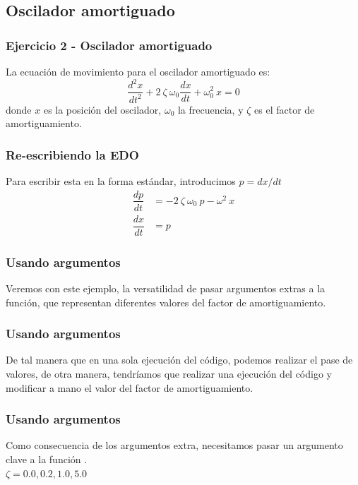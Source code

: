 \subsection{Oscilador amortiguado}
\begin{frame}
\frametitle{Ejercicio 2 - Oscilador amortiguado}
La ecuación de movimiento para el oscilador amortiguado es:
\[ \dfrac{d^{2} x}{dt^{2}} + 2 \: \zeta \:  \omega_{0} \dfrac{dx}{dt} + \omega_{0}^{2} \: x = 0\]
donde $x$ es la posición del oscilador, $\omega_{0}$ la frecuencia, y $\zeta$ es el factor de amortiguamiento.
\end{frame}
\begin{frame}
\frametitle{Re-escribiendo la EDO}
Para escribir esta  en la forma estándar, introducimos $p = dx/dt$
\begin{align*}
\dfrac{dp}{dt} &= - 2 \: \zeta \: \omega_{0} \: p - \omega^{2} \: x \\
\dfrac{dx}{dt} &= p
\end{align*}
\end{frame}
\begin{frame}
\frametitle{Usando argumentos}
Veremos con este ejemplo, la versatilidad de pasar argumentos extras a la función, que representan diferentes valores del factor de amortiguamiento.
\end{frame}
\begin{frame}
\frametitle{Usando argumentos}
De tal manera que en una sola ejecución del código, podemos realizar el pase de valores, de otra manera, tendríamos que realizar una ejecución del código y modificar a mano el valor del factor de amortiguamiento.
\end{frame}
\begin{frame}
\frametitle{Usando argumentos}
Como consecuencia de los argumentos extra, necesitamos pasar un argumento clave  a la función .
\\
\bigskip
$\zeta = 0.0, 0.2, 1.0, 5.0 $
\end{frame}
